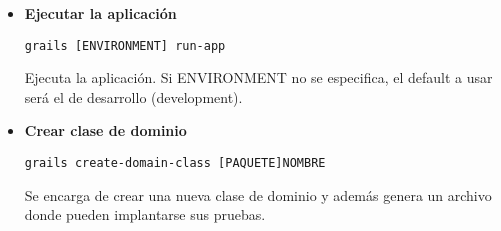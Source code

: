 \begin{itemize}
    \item \textbf{Ejecutar la aplicaci\'on}
        \begin{lstlisting}[gobble=11]
            grails [ENVIRONMENT] run-app
        \end{lstlisting}
        Ejecuta la aplicaci\'on. Si ENVIRONMENT no se especifica, el default a usar ser\'a el de desarrollo (development).
        
    \item \textbf{Crear clase de dominio}
        \begin{lstlisting}[gobble=11]
            grails create-domain-class [PAQUETE]NOMBRE
        \end{lstlisting}        
        Se encarga de crear una nueva clase de dominio y adem\'as genera un archivo donde pueden implantarse sus pruebas.
\end{itemize}
